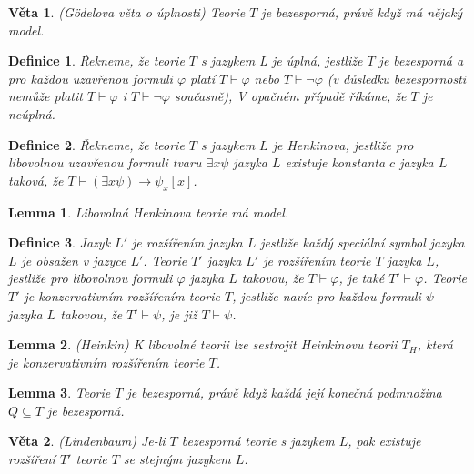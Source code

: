 \documentclass[a4paper, 11pt]{report}
\newtheorem{mydef}{Definice}[chapter]
\newtheorem{veta}{Věta}[chapter]
\newtheorem{lemma}{Lemma}[chapter]
\begin{document}
\begin{veta}
(Gödelova věta o úplnosti) Teorie $T$ je bezesporná, právě když má nějaký model.
\end{veta}

\begin{mydef}
Řekneme, že teorie $T$ s jazykem L je \emph{úplná}, jestliže $T$ je bezesporná a pro každou uzavřenou formuli $\varphi$ platí $T \vdash \varphi$ nebo $T \vdash \lnot \varphi$ (v důsledku bezespornosti nemůže platit $T \vdash \varphi$ i $T \vdash \lnot \varphi$ současně), V opačném případě říkáme, že $T$ je \emph{neúplná}.
\end{mydef}

\begin{mydef}
Řekneme, že teorie $T$ s jazykem $L$ je \emph{Henkinova}, jestliže pro libovolnou uzavřenou formuli tvaru $\exists x \psi$ jazyka $L$ existuje konstanta $c$ jazyka $L$ taková, že $T \vdash (\exists x \psi) \to \psi_x[x]$.
\end{mydef}

\begin{lemma}
Libovolná Henkinova teorie má model.
\end{lemma}

\begin{mydef}
Jazyk $L'$ je rozšířením jazyka $L$ jestliže každý speciální symbol jazyka $L$ je obsažen v jazyce $L'$. Teorie $T'$ jazyka $L'$ je rozšířením teorie $T$ jazyka $L$, jestliže pro libovolnou formuli $\varphi$ jazyka $L$ takovou, že $T \vdash \varphi$, je také $T' \vdash \varphi$. Teorie $T'$ je konzervativním rozšířením teorie $T$, jestliže  navíc pro každou formuli $\psi$ jazyka $L$ takovou, že $T' \vdash \psi$, je již $T \vdash \psi$.
\end{mydef}

\begin{lemma}
(Heinkin) K libovolné teorii lze sestrojit Heinkinovu teorii $T_H$, která je konzervativním rozšířením teorie $T$.
\end{lemma}

\begin{lemma}
Teorie $T$ je bezesporná, právě když každá její konečná podmnožina $Q \subseteq T$ je bezesporná.
\end{lemma}

\begin{veta}
(Lindenbaum) Je-li $T$ bezesporná teorie s jazykem $L$, pak existuje rozšíření $T'$ teorie $T$ se stejným jazykem $L$.
\end{veta}
\end{document}
